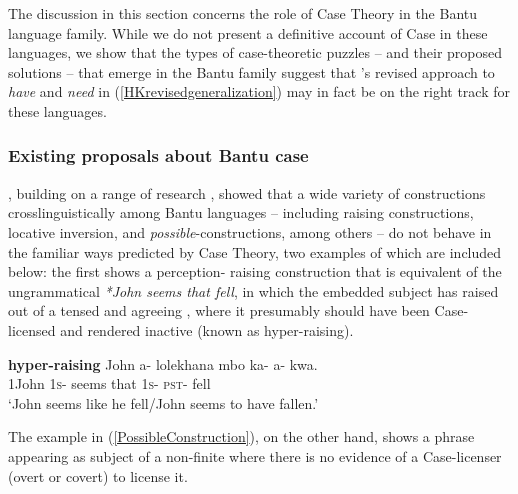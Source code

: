 \documentclass[output=paper,
modfonts
]{langscibook}
\begin{document}
The discussion in this section concerns the role of Case Theory in the Bantu language family.  While we do not present a definitive account of Case in these languages, we show that the types of case-theoretic puzzles -- and their proposed solutions -- that emerge in the Bantu family suggest that \citet{Harves:2012}'s revised approach to {\it have} and {\it need} in (\ref{HKrevisedgeneralization}) may in fact be on the right track for these languages.


\subsubsection{Existing proposals about Bantu case}
  \citet{Diercks:2012}, building on a range of
research  \citep[e.g.][]{Harford:1985,Ndayiragije:1999,Alsina:2001,Baker:2003a,Baker:2008anti}, showed that a wide variety of
  constructions crosslinguistically among Bantu languages -- including raising constructions, locative inversion,
  and {\it possible}-constructions, among others -- do not behave in
  the familiar ways predicted by Case Theory, two examples of which
  are included below: the first shows a perception- raising
  construction that is equivalent of the ungrammatical  {\it
    *John seems that fell}, in which the embedded subject has raised out
  of a tensed and agreeing ,  where it presumably should have
  been Case-licensed and  rendered inactive (known as hyper-raising). 

\begin{exe} \label{Hyper-raising}
\ex\textbf{ hyper-raising}
\exi{} {\gll John a- lolekhana mbo ka- a- kwa.  \\
1John 1\textsc{s}- seems that 1\textsc{s}- \textsc{pst}- fell \\
\glt `John seems like he fell/John seems to have fallen.'}
\end{exe}

The example in (\ref{PossibleConstruction}), on the other hand, shows a
 phrase appearing as subject of a non-finite  where there is
no evidence of a Case-licenser (overt or covert) to license it. 
\end{document}
